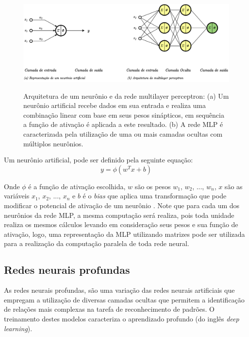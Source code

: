 \begin{figure}[htbp]
	\centering
	\caption{Arquitetura de um neurônio e da rede multilayer perceptron: (a) Um neurônio artificial recebe dados em sua entrada e realiza uma combinação linear com base em seus pesos sinápticos, em sequência a função de ativação é aplicada a este resultado. (b) A rede MLP é caracterizada pela utilização de uma ou mais camadas ocultas com múltiplos neurônios.}
		\includegraphics[scale=.25]{imagens/perceptron.png}
	\label{fig:perceptron}
\end{figure}

Um neurônio artificial, pode ser definido pela seguinte equação:
\begin{equation}
    y = \phi(w^{T}x + b)
\end{equation}

Onde $\phi$ é a função de ativação escolhida, $w$ são os pesos $w_1$, $w_2$, ..., $w_n$, $x$ são as variáveis $x_1$, $x_2$, ..., $x_n$ e $b$ é o \textit{bias} que aplica uma transformação que pode modificar o potencial de ativação de um neurônio \cite{haykinNeuralNetworksLearning2009}. Note que para cada um dos neurônios da rede MLP, a mesma computação será realiza, pois toda unidade realiza os mesmos cálculos levando em consideração seus pesos e sua função de ativação, logo, uma representação da MLP utilizando matrizes pode ser utilizada para a realização da computação paralela de toda rede neural.

\subsection{Redes neurais profundas}

As redes neurais profundas, são uma variação das redes neurais artificiais que empregam a utilização de diversas camadas ocultas que permitem a identificação de relações mais complexas na tarefa de reconhecimento de padrões. O treinamento destes modelos caracteriza o aprendizado profundo (do inglês \textit{deep learning}).

